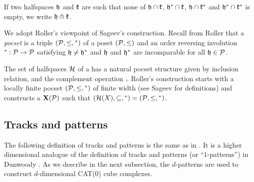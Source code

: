 If two halfspaces $\mathfrak{h}$ and $\mathfrak{k}$ are such that none of $\mathfrak{h}\cap \mathfrak{k}$, ${\mathfrak{h}}^*\cap\mathfrak{k}$, $\mathfrak{h}\cap {\mathfrak{k}}^*$ and ${\mathfrak{h}}^*\cap {\mathfrak{k}}^*$ is empty, we write $\mathfrak{h} \pitchfork \mathfrak{k}$. %

We adopt Roller's viewpoint of Sageev's construction. Recall from Roller \cite{Rol98} that a \emph{pocset} is a triple $(\mathcal{P},\le,{}^*)$ of a poset $(\mathcal{P},\le)$ and an order reversing involution ${}^*:\mathcal{P}\to\mathcal{P}$ satisfying $\mathfrak{h}\neq{\mathfrak{h}}^*$ and $\mathfrak{h}$ and ${\mathfrak{h}}^*$ are incomparable for all $\mathfrak{h}\in\mathcal{P}$.

The set of halfspaces $\mathcal{H}$ of a \CCC has a natural pocset structure given by inclusion relation, and the complement operation $\comp{}$. Roller's construction starts with a locally finite pocset $(\mathcal{P},\le,{}^*)$ of finite width  (see Sageev \cite{Sag12} for definitions) and constructs a \CCC $\mathbf{X}(\mathcal{P})$ such that $(\mathcal{H}(X),\subseteq, {}^*)=(\mathcal{P},\le,{}^*)$. 



\subsection{Tracks and patterns}\label{tracks and patterns}
The following definition of tracks and patterns is the same as in \cite{BeLa16}. It is a higher dimensional analogue of the definition of tracks and patterns (or ``$1$-patterns'') in Dunwoody \cite{Dun85}. 
As we describe in the next subsection, the $d$-patterns are used to construct $d$-dimensional CAT(0) cube complexes.

